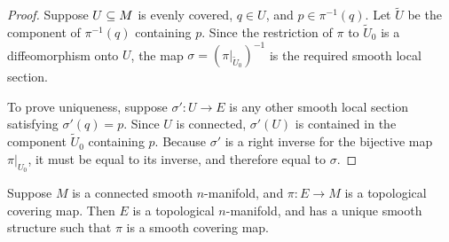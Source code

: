 \begin{proof}
Suppose $U\subseteq M$ is evenly covered, $q\in U$, and $p\in\pi^{-1}(q)$. Let $\widetilde{U}$ be the component of $\pi^{-1}(q)$ containing $p$. Since the restriction of $\pi$ to $\widetilde{U}_0$ is a diffeomorphism onto $U$, the map  $\sigma=(\pi|_{\widetilde{U}_0})^{-1}$ is the required smooth local section.\par
To prove uniqueness, suppose $\sigma':U\to E$ is any other smooth local section satisfying $\sigma'(q)=p$. Since $U$ is connected, $\sigma'(U)$ is contained in the component $\widetilde{U}_0$ containing $p$. Because $\sigma'$ is a right inverse for the bijective map $\pi|_{U_0}$, it must be equal to its inverse, and therefore equal to $\sigma$.
\end{proof}
\begin{theorem}\label{covering mani}
Suppose $M$ is a connected smooth $n$-manifold, and $\pi:E\to M$ is a topological covering map. Then $E$ is a topological $n$-manifold, and has a unique smooth structure such that $\pi$ is a smooth covering map.
\end{theorem}
